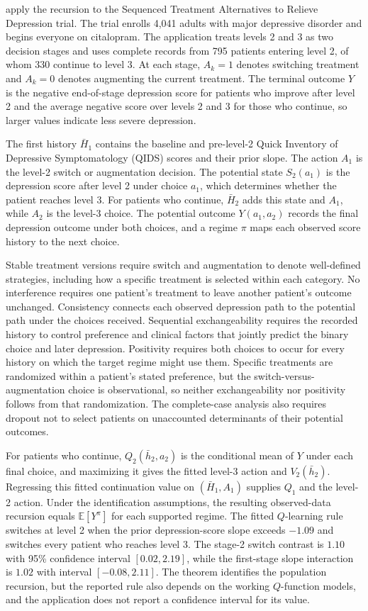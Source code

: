 \citet{schulte2014qlearning} apply the recursion to the Sequenced Treatment Alternatives to Relieve Depression trial. The trial enrolls 4,041 adults with major depressive disorder and begins everyone on citalopram. The application treats levels 2 and 3 as two decision stages and uses complete records from 795 patients entering level 2, of whom 330 continue to level 3. At each stage, $A_k=1$ denotes switching treatment and $A_k=0$ denotes augmenting the current treatment. The terminal outcome $Y$ is the negative end-of-stage depression score for patients who improve after level 2 and the average negative score over levels 2 and 3 for those who continue, so larger values indicate less severe depression.

The first history $\bar H_1$ contains the baseline and pre-level-2 Quick Inventory of Depressive Symptomatology (QIDS) scores and their prior slope. The action $A_1$ is the level-2 switch or augmentation decision. The potential state $S_2(a_1)$ is the depression score after level 2 under choice $a_1$, which determines whether the patient reaches level 3. For patients who continue, $\bar H_2$ adds this state and $A_1$, while $A_2$ is the level-3 choice. The potential outcome $Y(a_1,a_2)$ records the final depression outcome under both choices, and a regime $\pi$ maps each observed score history to the next choice.

Stable treatment versions require switch and augmentation to denote well-defined strategies, including how a specific treatment is selected within each category. No interference requires one patient's treatment to leave another patient's outcome unchanged. Consistency connects each observed depression path to the potential path under the choices received. Sequential exchangeability requires the recorded history to control preference and clinical factors that jointly predict the binary choice and later depression. Positivity requires both choices to occur for every history on which the target regime might use them. Specific treatments are randomized within a patient's stated preference, but the switch-versus-augmentation choice is observational, so neither exchangeability nor positivity follows from that randomization. The complete-case analysis also requires dropout not to select patients on unaccounted determinants of their potential outcomes.

For patients who continue, $Q_2(\bar h_2,a_2)$ is the conditional mean of $Y$ under each final choice, and maximizing it gives the fitted level-3 action and $V_2(\bar h_2)$. Regressing this fitted continuation value on $(\bar H_1,A_1)$ supplies $Q_1$ and the level-2 action. Under the identification assumptions, the resulting observed-data recursion equals $\mathbb E[Y^\pi]$ for each supported regime. The fitted $Q$-learning rule switches at level 2 when the prior depression-score slope exceeds $-1.09$ and switches every patient who reaches level 3. The stage-2 switch contrast is $1.10$ with 95\% confidence interval $[0.02,2.19]$, while the first-stage slope interaction is $1.02$ with interval $[-0.08,2.11]$. The theorem identifies the population recursion, but the reported rule also depends on the working $Q$-function models, and the application does not report a confidence interval for its value.

